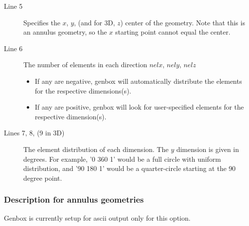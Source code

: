 \begin{description} 
  
  \item[Line 5] Specifies the $x$, $y$, (and for 3D, $z$) center of the
    geometry. Note that this is an annulus geometry, so the $x$ starting point
    cannot equal the center.

  \item[Line 6] The number of elements in each direction $nelx$, $nely$, $nelz$

    \begin{itemize}

      \item If any are negative, genbox will automatically distribute the
        elements for the respective dimensions(s).

      \item If any are positive, genbox will look for user-specified elements
        for the respective dimension(s).

    \end{itemize}

  \item [Lines 7, 8, (9 in 3D)] The element distribution of each dimension.  The
    $y$ dimension is given in degrees. For example, '0 360 1' would be a full
    circle with uniform distribution, and '90 180 1' would be a quarter-circle
    starting at the 90 degree point.

\end{description}

\subsubsection{Description for annulus geometries}

Genbox is currently setup for ascii output only for this option.

